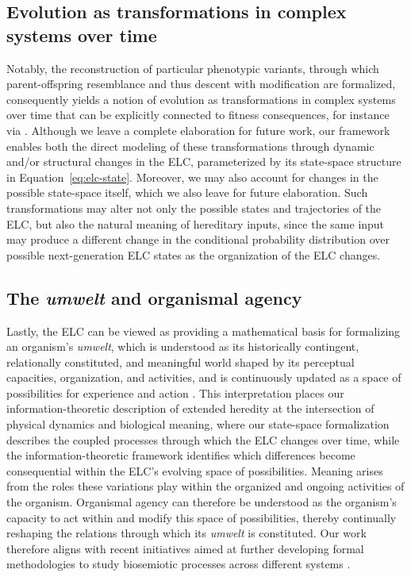 \documentclass[pdflatex,sn-mathphys-num]{sn-jnl}
\theoremstyle{thmstylethree}
\theoremstyle{thmstyleone}
\begin{document}
\subsection{Evolution as transformations in complex systems over time}
Notably, the reconstruction of particular phenotypic variants, through which parent-offspring resemblance and thus descent with modification are formalized, consequently yields a notion of evolution as transformations in complex systems over time that can be explicitly connected to fitness consequences, for instance via \cite{lean2014getting}. Although we leave a complete elaboration for future work, our framework enables both the direct modeling of these transformations through dynamic and/or structural changes in the ELC, parameterized by its state-space structure in Equation~\ref{eq:elc-state}. Moreover, we may also account for changes in the possible state-space itself, which we also leave for future elaboration. Such transformations may alter not only the possible states and trajectories of the ELC, but also the natural meaning of hereditary inputs, since the same input may produce a different change in the conditional probability distribution over possible next-generation ELC states as the organization of the ELC changes. 

\subsection{The \textit{umwelt} and organismal agency}
Lastly, the ELC can be viewed as providing a mathematical basis for formalizing an organism’s \textit{umwelt}, which is understood as its historically contingent, relationally constituted, and meaningful world shaped by its perceptual capacities, organization, and activities, and is continuously updated as a space of possibilities for experience and action \cite{uexkull2010foray,wolfe2026organisms, sharov2026semiotic, svorcova2026evolution}. This interpretation places our information-theoretic description of extended heredity at the intersection of physical dynamics and biological meaning, where our state-space formalization describes the coupled processes through which the ELC changes over time, while the information-theoretic framework identifies which differences become consequential within the ELC’s evolving space of possibilities. Meaning arises from the roles these variations play within the organized and ongoing activities of the organism. Organismal agency can therefore be understood as the organism’s capacity to act within and modify this space of possibilities, thereby continually reshaping the relations through which its \textit{umwelt} is constituted. Our work therefore aligns with recent initiatives aimed at further developing formal methodologies to study biosemiotic processes across different systems \cite{maekivi2026methodological, vega2024cell, cerrone2021zoosemiotic}.
\end{document}
